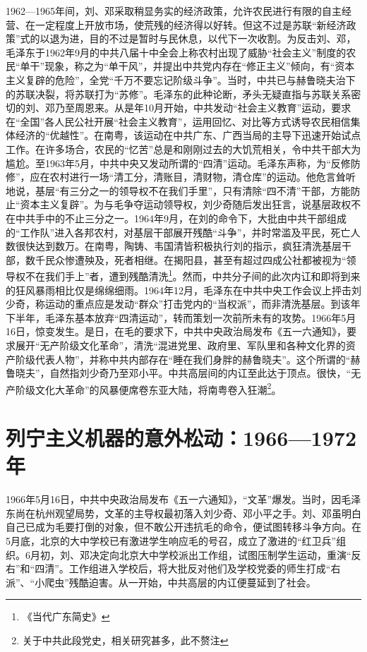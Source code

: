 1962—1965年间，刘、邓采取稍显务实的经济政策，允许农民进行有限的自主经营、在一定程度上开放市场，使荒残的经济得以好转。但这不过是苏联“新经济政策”式的以退为进，目的不过是暂时与民休息，以代下一次收割。为反击刘、邓，毛泽东于1962年9月的中共八届十中全会上称农村出现了威胁“社会主义”制度的农民“单干”现象，称之为“单干风”，并提出中共党内存在“修正主义”倾向，有“资本主义复辟的危险”，全党“千万不要忘记阶级斗争”。当时，中共已与赫鲁晓夫治下的苏联决裂，将苏联打为“苏修”。毛泽东的此种论断，矛头无疑直指与苏联关系密切的刘、邓乃至周恩来。从是年10月开始，中共发动“社会主义教育”运动，要求在“全国”各人民公社开展“社会主义教育”，运用回忆、对比等方式诱导农民相信集体经济的“优越性”。在南粤，该运动在中共广东、广西当局的主导下迅速开始试点工作。在许多场合，农民的“忆苦”总是和刚刚过去的大饥荒相关，令中共干部大为尴尬。至1963年5月，中共中央又发动所谓的“四清”运动。毛泽东声称，为“反修防修”，应在农村进行一场“清工分，清账目，清财物，清仓库”的运动。他危言耸听地说，基层“有三分之一的领导权不在我们手里”，只有清除“四不清”干部，方能防止“资本主义复辟”。为与毛争夺运动领导权，刘少奇随后发出狂言，说基层政权不在中共手中的不止三分之一。1964年9月，在刘的命令下，大批由中共干部组成的“工作队”进入各邦农村，对基层干部展开残酷“斗争”，并时常滥及平民，死亡人数很快达到数万。在南粤，陶铸、韦国清皆积极执行刘的指示，疯狂清洗基层干部，数千民众惨遭殃及，死者相继。在揭阳县，甚至有超过四成公社都被视为“领导权不在我们手上”者，遭到残酷清洗\footnote{《当代广东简史》}。然而，中共分子间的此次内讧和即将到来的狂风暴雨相比仅是绵绵细雨。1964年12月，毛泽东在中共中央工作会议上抨击刘少奇，称运动的重点应是发动“群众”打击党内的“当权派”，而非清洗基层。到该年下半年，毛泽东基本放弃“四清运动”，转而策划一次前所未有的攻势。1966年5月16日，惊变发生。是日，在毛的要求下，中共中央政治局发布《五一六通知》，要求展开“无产阶级文化革命”，清洗“混进党里、政府里、军队里和各种文化界的资产阶级代表人物”，并称中共内部存在“睡在我们身胖的赫鲁晓夫”。这个所谓的“赫鲁晓夫”，自然指刘少奇乃至邓小平。中共高层间的内讧至此达于顶点。很快，“无产阶级文化大革命”的风暴便席卷东亚大陆，将南粤卷入狂潮\footnote{关于中共此段党史，相关研究甚多，此不赘注}。

\section{列宁主义机器的意外松动：1966—1972年}

\indent 1966年5月16日，中共中央政治局发布《五一六通知》，“文革”爆发。当时，因毛泽东尚在杭州观望局势，文革的主导权最初落入刘少奇、邓小平之手。刘、邓虽明白自己已成为毛要打倒的对象，但不敢公开违抗毛的命令，便试图转移斗争方向。在5月底，北京的大中学校已有激进学生响应毛的号召，成立了激进的“红卫兵”组织。6月初，刘、邓决定向北京大中学校派出工作组，试图压制学生运动，重演“反右”和“四清”。工作组进入学校后，将大批反对他们及学校党委的师生打成“右派”、“小爬虫”残酷迫害。从一开始，中共高层的内讧便蔓延到了社会。

